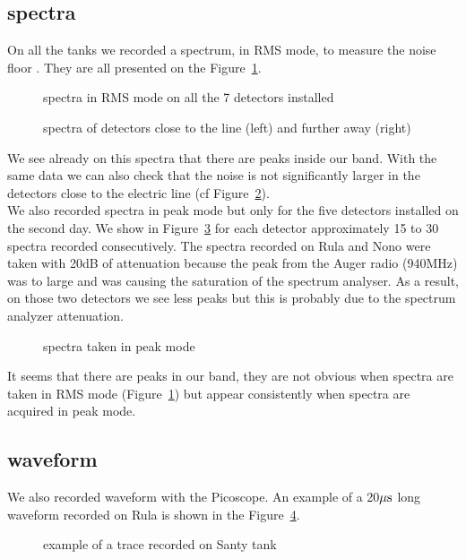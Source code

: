 \subsection{spectra}
On all the  tanks we recorded a spectrum, in RMS  mode, to measure the
noise    floor     .    They     are    all    presented     on    the
Figure~\ref{fig:noisefloor}.
\begin{figure}[ht!]
  \centering
  \hspace*{-3ex}
  \caption{spectra in RMS mode on all the 7 detectors installed}
  \label{fig:noisefloor}
\end{figure}
\begin{figure}[ht!]
  \centering
  \hspace*{-3ex}
  \caption{spectra of detectors close to the line (left) and further away (right)}
  \label{fig:linenoline}
\end{figure}
We see already  on this spectra that there are  peaks inside our band.
With  the  same  data  we  can  also  check  that  the  noise  is  not
significantly larger in  the detectors close to the  electric line (cf
Figure~\ref{fig:linenoline}).\\ We also  recorded spectra in peak mode
but only for the five detectors  installed on the second day.  We show
in Figure~\ref{fig:specpeak} for each  detector approximately 15 to 30
spectra recorded consecutively. The  spectra recorded on Rula and Nono
were taken  with 20dB of attenuation  because the peak  from the Auger
radio  (940MHz) was to  large and  was causing  the saturation  of the
spectrum analyser.   As a result, on  those two detectors  we see less
peaks but this is probably due to the spectrum analyzer attenuation.
\begin{figure}[ht!]
  \centering
  \hspace*{-3ex}
  \caption{spectra taken in peak mode}
  \label{fig:specpeak}
\end{figure}
It seems that  there are peaks in our band, they  are not obvious when
spectra are taken in RMS mode (Figure~\ref{fig:noisefloor}) but appear
consistently when spectra are acquired in peak mode.


\subsection{waveform}
We also recorded  waveform with the Picoscope. An  example of a 20$\rm
\mu s$ long waveform recorded on Rula is shown in the Figure~\ref{fig:wf}.
\begin{figure}[ht!]
  \centering
  \hspace*{-3ex}
  \caption{example of a trace recorded on Santy tank}
  \label{fig:wf}
\end{figure}

